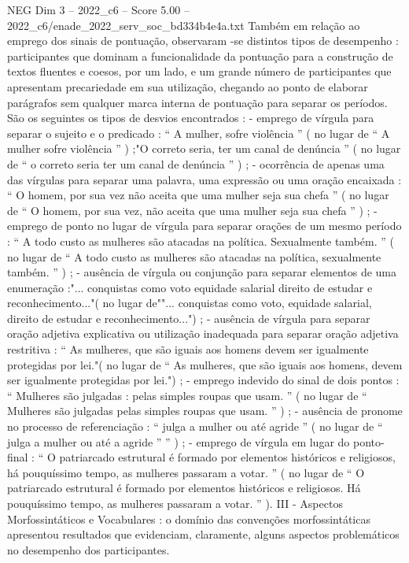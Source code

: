 \begin{textsample}{NEG Dim 3 – 2022\_c6 – Score 5.00 – 2022\_c6/enade\_2022\_serv\_soc\_bd334b4e4a.txt}
Também em relação ao emprego dos sinais de pontuação, observaram -se distintos tipos de desempenho : participantes que dominam a funcionalidade da pontuação para a construção de textos fluentes e coesos, por um lado, e um grande número de participantes que apresentam precariedade em sua utilização, chegando ao ponto de elaborar parágrafos sem qualquer marca interna de pontuação para separar os períodos.
São os seguintes os tipos de desvios encontrados : - emprego de vírgula para separar o sujeito e o predicado : “ A mulher, sofre violência ” ( no lugar de “ A mulher sofre violência ” ) ;"O correto seria, ter um canal de denúncia ” ( no lugar de “ o correto seria ter um canal de denúncia ” ) ; - ocorrência de apenas uma das vírgulas para separar uma palavra, uma expressão ou uma oração encaixada : “ O homem, por sua vez não aceita que uma mulher seja sua chefa ” ( no lugar de “ O homem, por sua vez, não aceita que uma mulher seja sua chefa ” ) ; - emprego de ponto no lugar de vírgula para separar orações de um mesmo período : “ A todo custo as mulheres são atacadas na política.
Sexualmente também. ” ( no lugar de “ A todo custo as mulheres são atacadas na política, sexualmente também. ” ) ; - ausência de vírgula ou conjunção para separar elementos de uma enumeração :"... conquistas como voto equidade salarial direito de estudar e reconhecimento..."( no lugar de""... conquistas como voto, equidade salarial, direito de estudar e reconhecimento...") ; - ausência de vírgula para separar oração adjetiva explicativa ou utilização inadequada para separar oração adjetiva restritiva : “ As mulheres, que são iguais aos homens devem ser igualmente protegidas por lei."( no lugar de “ As mulheres, que são iguais aos homens, devem ser igualmente protegidas por lei.") ; - emprego indevido do sinal de dois pontos : “ Mulheres são julgadas : pelas simples roupas que usam. ” ( no lugar de “ Mulheres são julgadas pelas simples roupas que usam. ” ) ; - ausência de pronome no processo de referenciação : “ julga a mulher ou até agride ” ( no lugar de “ julga a mulher ou até a agride ” ” ) ; - emprego de vírgula em lugar do ponto-final : “ O patriarcado estrutural é formado por elementos históricos e religiosos, há pouquíssimo tempo, as mulheres passaram a votar. ” ( no lugar de “ O patriarcado estrutural é formado por elementos históricos e religiosos.
Há pouquíssimo tempo, as mulheres passaram a votar. ” ).
III - Aspectos Morfossintáticos e Vocabulares : o domínio das convenções morfossintáticas apresentou resultados que evidenciam, claramente, alguns aspectos problemáticos no desempenho dos participantes.

\end{textsample}
